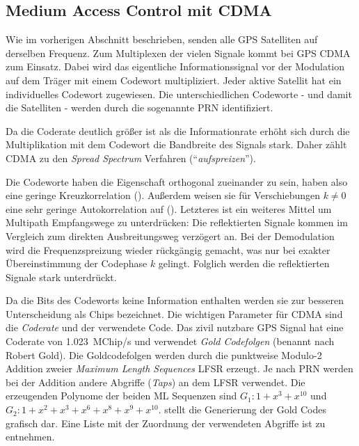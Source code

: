 \subsection{Medium Access Control mit CDMA}
\label{basics_cdma}

Wie im vorherigen Abschnitt beschrieben, senden alle GPS Satelliten auf derselben Frequenz. Zum Multiplexen der vielen Signale kommt bei GPS \gls{CDMA} zum Einsatz. Dabei wird das eigentliche Informationssignal vor der Modulation auf dem Träger mit einem Codewort multipliziert. Jeder aktive Satellit hat ein individuelles Codewort zugewiesen. Die unterschiedlichen Codeworte - und damit die Satelliten - werden durch die sogenannte \gls{PRN} identifiziert.

Da die Coderate deutlich größer ist als die Informationrate erhöht sich durch die Multiplikation mit dem Codewort die Bandbreite des Signals stark. Daher zählt \gls{CDMA} zu den \emph{Spread Spectrum} Verfahren (\enquote{\emph{aufspreizen}}).

Die Codeworte haben die Eigenschaft orthogonal zueinander zu sein, haben also eine geringe Kreuzkorrelation (). Außerdem weisen sie für Verschiebungen $k\neq0$ eine sehr geringe Autokorrelation auf (). Letzteres ist ein weiteres Mittel um Multipath Empfangswege zu unterdrücken: Die reflektierten Signale kommen im Vergleich zum direkten Ausbreitungsweg verzögert an. Bei der Demodulation wird die Frequenzspreizung wieder rückgängig gemacht, was nur bei exakter Übereinstimmung der Codephase $k$ gelingt. Folglich werden die reflektierten Signale stark unterdrückt.





Da die Bits des Codeworts keine Information enthalten werden sie zur besseren Unterscheidung als \glspl{Chip} bezeichnet. Die wichtigen Parameter für CDMA sind die \emph{Coderate} und der verwendete Code. Das zivil nutzbare GPS Signal hat eine Coderate von \SI{1.023}{MChip/s} und verwendet \emph{Gold Codefolgen} (benannt nach Robert Gold). Die Goldcodefolgen werden durch die punktweise Modulo-2 Addition zweier \emph{Maximum Length Sequences} \gls{LFSR} erzeugt. Je nach \gls{PRN} werden bei der Addition andere Abgriffe (\emph{Taps}) an dem \gls{LFSR} verwendet. Die erzeugenden Polynome der beiden ML Sequenzen sind $G_1: 1 + x^3 + x^10$ und $G_2: 1 + x^2 + x^3 +x^6 + x^8 + x^9 + x^{10}$.  stellt die Generierung der Gold Codes grafisch dar. Eine Liste mit der Zuordnung der verwendeten Abgriffe ist \cite{specification2010gps} zu entnehmen.


